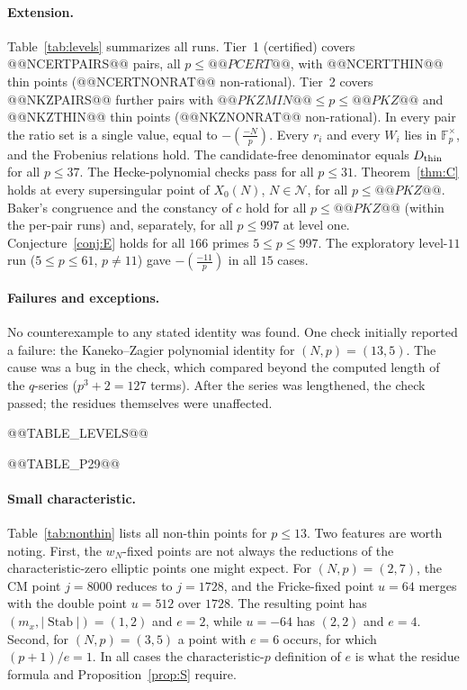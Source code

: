 \documentclass[11pt,a4paper]{article}
\numberwithin{equation}{section}
\theoremstyle{definition}
\theoremstyle{remark}
\newcommand{\Fp}{\mathbb F_p}
\newcommand{\Stab}{\operatorname{Stab}}
\newcommand{\leg}[2]{\left(\frac{#1}{#2}\right)}
\newcommand{\Lp}[1]{\left(\frac{#1}{p}\right)}
\begin{document}
\paragraph{Extension.} Table~\ref{tab:levels} summarizes all runs. Tier~1 (certified) covers
@@NCERTPAIRS@@ pairs, all $p\le @@PCERT@@$, with @@NCERTTHIN@@ thin points (@@NCERTNONRAT@@ non-rational). Tier~2 covers
@@NKZPAIRS@@ further pairs with $@@PKZMIN@@\le p\le @@PKZ@@$ and @@NKZTHIN@@ thin points (@@NKZNONRAT@@ non-rational). In every pair the ratio
set is a single value, equal to $-\Lp{-N}$. Every $r_i$ and every $W_i$ lies in $\Fp^\times$, and
the Frobenius relations hold. The candidate-free denominator equals $D_{\rm thin}$ for all $p\le37$.
The Hecke-polynomial checks pass for all $p\le31$. Theorem~\ref{thm:C} holds at every supersingular
point of $X_0(N)$, $N\in\mathcal N$, for all $p\le @@PKZ@@$. Baker's congruence and the constancy of $c$ hold for all $p\le @@PKZ@@$
(within the per-pair runs) and, separately, for all $p\le997$ at level one. Conjecture~\ref{conj:E} holds for all $166$
primes $5\le p\le997$. The exploratory level-$11$ run ($5\le p\le61$, $p\ne11$) gave $-\leg{-11}{p}$ in all $15$ cases.

\paragraph{Failures and exceptions.} No counterexample to any stated identity was found. One check
initially reported a failure: the Kaneko--Zagier polynomial identity for $(N,p)=(13,5)$. The cause was a bug in the check, which compared beyond the
computed length of the $q$-series ($p^3+2=127$ terms). After the series was
lengthened, the check passed; the residues themselves were unaffected.

@@TABLE_LEVELS@@

@@TABLE_P29@@

\paragraph{Small characteristic.} Table~\ref{tab:nonthin} lists all non-thin points for $p\le13$.
Two features are worth noting. First, the $w_N$-fixed points are not always the reductions of
the characteristic-zero elliptic points one might expect. For $(N,p)=(2,7)$, the CM point $j=8000$ reduces to $j=1728$, and the Fricke-fixed point $u=64$ merges with the double point $u=512$ over $1728$. The
resulting point has $(m_x,|\Stab|)=(1,2)$ and $e=2$, while $u=-64$ has $(2,2)$ and $e=4$.
Second, for $(N,p)=(3,5)$ a point with $e=6$ occurs, for which $(p+1)/e=1$. In all cases the
characteristic-$p$ definition of $e$ is what the residue formula and Proposition~\ref{prop:S} require.
\end{document}
